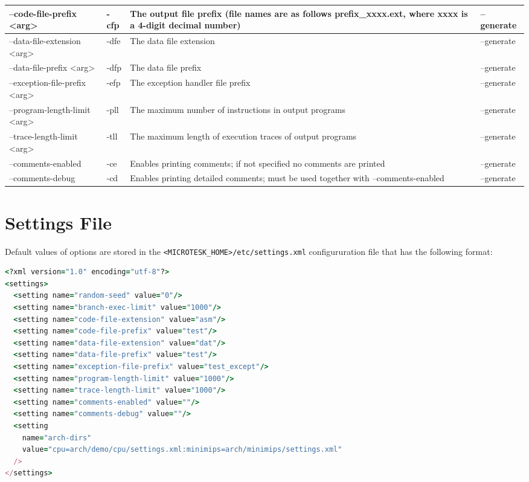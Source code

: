 \documentclass[oneside,final,12pt]{extreport}
\begin{document}
\begin{tabular}{ | p{4cm} | p{1cm} | p{5cm} | p{2.5cm} |}
  \hline
  --code-file-prefix <arg> & -cfp & The output file prefix (file names are as follows prefix{\_}xxxx.ext, where xxxx is a 4-digit decimal number) & --generate \\ \hline
  --data-file-extension <arg> & -dfe & The data file extension & --generate \\ \hline
  --data-file-prefix <arg> & -dfp & The data file prefix & --generate \\ \hline
  --exception-file-prefix <arg> & -efp & The exception handler file prefix & --generate \\ \hline
  --program-length-limit <arg> & -pll & The maximum number of instructions in output programs & --generate \\ \hline
  --trace-length-limit <arg> & -tll & The maximum length of execution traces of output programs & --generate \\ \hline
  --comments-enabled & -ce & Enables printing comments; if not specified no comments are printed & --generate \\ \hline
  --comments-debug & -cd & Enables printing detailed comments; must be used together with --comments-enabled  & --generate \\ \hline
\end{tabular}

\section{Settings File}

Default values of options are stored in the \texttt{<MICROTESK{\_}HOME>/etc/settings.xml}
configururation file that has the following format:

\begin{lstlisting}[language=ruby]
<?xml version="1.0" encoding="utf-8"?>
<settings>
  <setting name="random-seed" value="0"/>
  <setting name="branch-exec-limit" value="1000"/>
  <setting name="code-file-extension" value="asm"/>
  <setting name="code-file-prefix" value="test"/>
  <setting name="data-file-extension" value="dat"/>
  <setting name="data-file-prefix" value="test"/>
  <setting name="exception-file-prefix" value="test_except"/>
  <setting name="program-length-limit" value="1000"/>
  <setting name="trace-length-limit" value="1000"/>
  <setting name="comments-enabled" value=""/>
  <setting name="comments-debug" value=""/>
  <setting
    name="arch-dirs" 
    value="cpu=arch/demo/cpu/settings.xml:minimips=arch/minimips/settings.xml"
  />
</settings>
\end{lstlisting}
\end{document}
